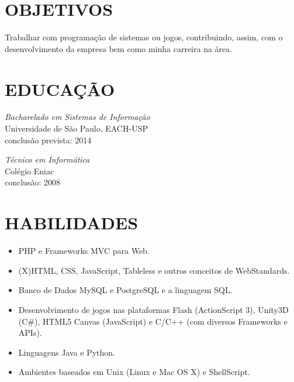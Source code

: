 \documentclass[line,margin]{res}
\begin{document}

\address{Av. Sete de Setembro, 1256 - Guarulhos - São Paulo}
\address{(11) 9932-6440 - bruno@croci.me - http://bruno.croci.me/}

 
\begin{resume}
 
\section{OBJETIVOS} Trabalhar com programação de sistemas ou jogos, contribuindo,
                 assim, com o desenvolvimento da empresa bem como minha carreira
                 na área.
 
 
\section{EDUCAÇÃO} {\sl Bacharelado em Sistemas de Informação} \\
                Universidade de São Paulo, EACH-USP \\
                conclusão prevista: 2014
                
                {\sl Técnico em Informática} \\
                Colégio Eniac \\
                conclusão: 2008 \\
 
 
\section{HABILIDADES} \begin{itemize}  \itemsep -2pt
                 \item PHP e Frameworks MVC para Web.
                 \item (X)HTML, CSS, JavaScript, Tableless e outros conceitos de WebStandards.
                 \item Banco de Dados MySQL e PostgreSQL e a linguagem SQL.
                 \item Desenvolvimento de jogos nas plataformas Flash (ActionScript 3), Unity3D (C\#),
                       HTML5 Canvas (JavaScript) e C/C++ (com diversos Frameworks e APIs).
                 \item Linguagens Java e Python.
                 \item Ambientes baseados em Unix (Linux e Mac OS X) e ShellScript.
                 \end{itemize}
 

\end{resume}
\end{document}
